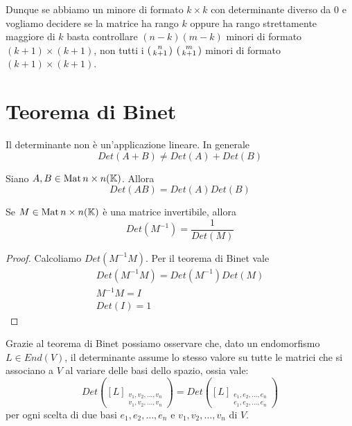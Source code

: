 Dunque se abbiamo un minore di formato $k \times k$ con determinante diverso da 0
e vogliamo decidere se la matrice ha rango $k$ oppure ha rango strettamente
maggiore di $k$ basta controllare $(n - k)(m - k)$ minori di formato
$(k + 1) \times (k + 1)$, non tutti i
$\begin{psmallmatrix} n \\ k + 1 \end{psmallmatrix}$
$\begin{psmallmatrix} m \\ k + 1 \end{psmallmatrix}$ minori di formato
$(k + 1) \times (k + 1)$.

\section{Teorema di Binet}
Il determinante non è un'applicazione lineare. In generale
\[ Det(A + B) \neq Det(A) + Det(B) \]

\begin{theorem}
	Siano $A, B \in \operatorname{Mat}{n \times n}(\mathbb{K})$. Allora
	\[
		Det(AB) = Det(A)Det(B)
	\]
\end{theorem}

\begin{corollary}
	Se $M \in \operatorname{Mat}{n \times n}(\mathbb{K})$ è una matrice invertibile, allora
	\[
		Det(M^{-1}) = \frac{1}{Det(M)}
	\]
	\begin{proof}
		Calcoliamo $Det(M^{-1} M)$. Per il teorema di Binet vale
		\begin{gather*}
			Det(M^{-1} M) = Det(M^{-1})Det(M) \\
			M^{-1}M = I \\
			Det(I) = 1
		\end{gather*}
	\end{proof}
\end{corollary}

Grazie al teorema di Binet possiamo osservare che, dato un endomorfismo
$L \in End(V)$, il determinante assume lo stesso valore su tutte le matrici
che si associano a $V$ al variare delle basi dello spazio, ossia vale:
\[
	Det \left(
	[L]_{\substack{
			v_1, v_2, \dots, v_n \\
			v_1, v_2, \dots, v_n
		}}
	\right) =
	Det \left(
	[L]_{\substack{
			e_1, e_2, \dots, e_n \\
			e_1, e_2, \dots, e_n
		}}
	\right)
\]
per ogni scelta di due basi $e_1, e_2, \dots, e_n$ e $v_1, v_2, \dots, v_n$
di $V$.

